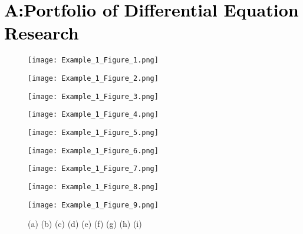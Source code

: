 \documentclass{TMLSStyleGuideResumeVitae}
\begin{document}
\section{\textcolor{black}{A:Portfolio of Differential Equation Research}}


\begin{figure}[h]
\centering
\begin{minipage}[b]{0.3\linewidth}
\texttt{[image: Example\_1\_Figure\_1.png]}
\end{minipage}\hfill
\begin{minipage}[b]{0.3\linewidth}
\texttt{[image: Example\_1\_Figure\_2.png]}
\end{minipage}\hfill	
\begin{minipage}[b]{0.3\linewidth}
\texttt{[image: Example\_1\_Figure\_3.png]}
\end{minipage}\hfill
\begin{minipage}[b]{0.3\linewidth}
\texttt{[image: Example\_1\_Figure\_4.png]}
\end{minipage}\hfill
\begin{minipage}[b]{0.3\linewidth}
\texttt{[image: Example\_1\_Figure\_5.png]}
\end{minipage}\hfill	
\begin{minipage}[b]{0.3\linewidth}
\texttt{[image: Example\_1\_Figure\_6.png]}
\end{minipage}\hfill
\begin{minipage}[b]{0.3\linewidth}
\texttt{[image: Example\_1\_Figure\_7.png]}
\end{minipage}\hfill
\begin{minipage}[b]{0.3\linewidth}
\texttt{[image: Example\_1\_Figure\_8.png]}
\end{minipage}\hfill	
\begin{minipage}[b]{0.3\linewidth}
\texttt{[image: Example\_1\_Figure\_9.png]}
\end{minipage}\hfill
\caption{(a) (b) (c) (d) (e) (f) (g) (h) (i) }
\label{fig:Figure1}
\end{figure} 
\end{document}
